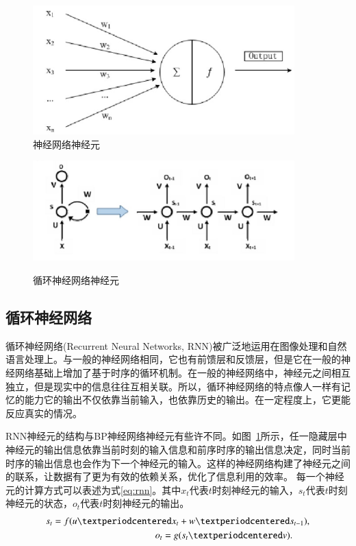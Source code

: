 \begin{figure}[b]
    \centering
    \begin{minipage}[t]{0.4\linewidth}
        \centering
        \includegraphics[width=0.9\textwidth]
        {figures/nnc.png}\\
        \caption{神经网络神经元}
        \label{fig:nnc}
    \end{minipage}
    \begin{minipage}[t]{0.5\linewidth}
        \centering
        \includegraphics[width=0.9\textwidth]
        {figures/rnnc.png}\\
        \caption{循环神经网络神经元}
        \label{fig:rnnc}
    \end{minipage}
\end{figure}

\subsection{循环神经网络}
循环神经网络(Recurrent Neural Networks, RNN)被广泛地运用在图像处理和自然语言处理上。与一般的神经网络相同，它也有前馈层和反馈层，但是它在一般的神经网络基础上增加了基于时序的循环机制。在一般的神经网络中，神经元之间相互独立，但是现实中的信息往往互相关联。所以，循环神经网络的特点像人一样有记忆的能力它的输出不仅依靠当前输入，也依靠历史的输出。在一定程度上，它更能反应真实的情况。

RNN神经元的结构与BP神经网络神经元有些许不同。如图~\ref{fig:rnnc}所示，任一隐藏层中神经元的输出信息依靠当前时刻的输入信息和前序时序的输出信息决定，同时当前时序的输出信息也会作为下一个神经元的输入。这样的神经网络构建了神经元之间的联系，让数据有了更为有效的依赖关系，优化了信息利用的效率。
每一个神经元的计算方式可以表述为式\eqref{eq:rnn}。其中$x_t$代表$t$时刻神经元的输入，$s_t$代表$t$时刻神经元的状态，$o_t$代表$t$时刻神经元的输出。
\begin{equation}
  \begin{split}
    s_t = f(u· x_t + w · s_{t-1}), \\
    o_t = g(s_t·v).\hspace{1.8em}
  \end{split}
  \label{eq:rnn}
\end{equation}

